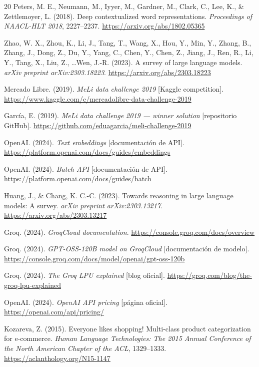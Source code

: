\documentclass[11pt,a4paper]{article}
\begin{document}
\begin{thebibliography}{20}
Peters, M. E., Neumann, M., Iyyer, M., Gardner, M., Clark, C., Lee, K., \& Zettlemoyer, L. (2018). Deep contextualized word representations. \textit{Proceedings of NAACL-HLT 2018}, 2227--2237. \url{https://arxiv.org/abs/1802.05365}

Zhao, W. X., Zhou, K., Li, J., Tang, T., Wang, X., Hou, Y., Min, Y., Zhang, B., Zhang, J., Dong, Z., Du, Y., Yang, C., Chen, Y., Chen, Z., Jiang, J., Ren, R., Li, Y., Tang, X., Liu, Z., \ldots Wen, J.-R. (2023). A survey of large language models. \textit{arXiv preprint arXiv:2303.18223}. \url{https://arxiv.org/abs/2303.18223}

Mercado Libre. (2019). \textit{MeLi data challenge 2019} [Kaggle competition]. \url{https://www.kaggle.com/c/mercadolibre-data-challenge-2019}

García, E. (2019). \textit{MeLi data challenge 2019 --- winner solution} [repositorio GitHub]. \url{https://github.com/eduagarcia/meli-challenge-2019}

OpenAI. (2024). \textit{Text embeddings} [documentación de API]. \url{https://platform.openai.com/docs/guides/embeddings}

OpenAI. (2024). \textit{Batch API} [documentación de API]. \url{https://platform.openai.com/docs/guides/batch}

Huang, J., \& Chang, K. C.-C. (2023). Towards reasoning in large language models: A survey. \textit{arXiv preprint arXiv:2303.13217}. \url{https://arxiv.org/abs/2303.13217}

Groq. (2024). \textit{GroqCloud documentation}. \url{https://console.groq.com/docs/overview}

Groq. (2024). \textit{GPT-OSS-120B model on GroqCloud} [documentación de modelo]. \url{https://console.groq.com/docs/model/openai/gpt-oss-120b}

Groq. (2024). \textit{The Groq LPU explained} [blog oficial]. \url{https://groq.com/blog/the-groq-lpu-explained}

OpenAI. (2024). \textit{OpenAI API pricing} [página oficial]. \url{https://openai.com/api/pricing/}

Kozareva, Z. (2015). Everyone likes shopping! Multi-class product categorization for e-commerce. \textit{Human Language Technologies: The 2015 Annual Conference of the North American Chapter of the ACL}, 1329--1333. \url{https://aclanthology.org/N15-1147}


\end{thebibliography}
\end{document}
